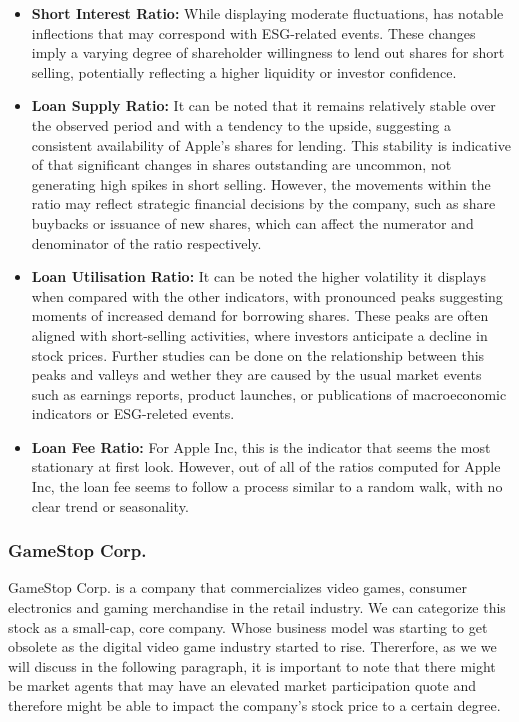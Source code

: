 \begin{itemize}
	\item\textbf{Short Interest Ratio:} While displaying moderate fluctuations, has notable inflections that may correspond with ESG-related events. These changes imply a varying degree of shareholder willingness to lend out shares for short selling, potentially reflecting a higher liquidity or investor confidence.
	\item\textbf{Loan Supply Ratio:} It can be noted that it remains relatively stable over the observed period and with a tendency to the upside, suggesting a consistent availability of Apple's shares for lending. This stability is indicative of that significant changes in shares outstanding are uncommon, not generating high spikes in short selling. However, the movements within the ratio may reflect strategic financial decisions by the company, such as share buybacks or issuance of new shares, which can affect the numerator and denominator of the ratio respectively.
	\item\textbf{Loan Utilisation Ratio:} It can be noted the higher volatility it displays when compared with the other indicators, with pronounced peaks suggesting moments of increased demand for borrowing shares. These peaks are often aligned with short-selling activities, where investors anticipate a decline in stock prices. Further studies can be done on the relationship between this peaks and valleys and wether they are caused by the usual market events such as earnings reports, product launches, or publications of macroeconomic indicators or ESG-releted events.
	\item\textbf{Loan Fee Ratio:} For Apple Inc, this is the indicator that seems the most stationary at first look. However, out of all of the ratios computed for Apple Inc, the loan fee seems to follow a process similar to a random walk, with no clear trend or seasonality.
\end{itemize}


\subsubsection{GameStop Corp.}

GameStop Corp. is a company that commercializes video games, consumer electronics and gaming merchandise in the retail industry. We can categorize this stock as a small-cap, core company. Whose business model was starting to get obsolete as the digital video game industry started to rise. Thererfore, as we we will discuss in the following paragraph, it is important to note that there might be market agents that may have an elevated market participation quote and therefore might be able to impact the company's stock price to a certain degree.


